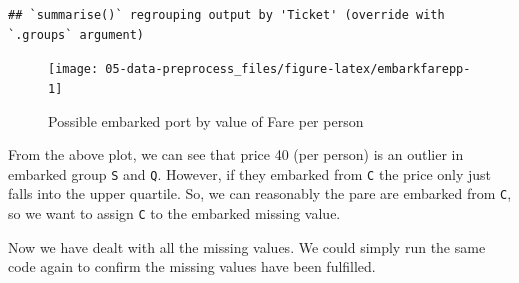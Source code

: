 \documentclass[
]{book}
\newenvironment{Shaded}{\begin{snugshade}}{\end{snugshade}}
\newcommand{\DataTypeTok}[1]{\textcolor[rgb]{0.13,0.29,0.53}{#1}}
\newcommand{\DecValTok}[1]{\textcolor[rgb]{0.00,0.00,0.81}{#1}}
\newcommand{\KeywordTok}[1]{\textcolor[rgb]{0.13,0.29,0.53}{\textbf{#1}}}
\newcommand{\NormalTok}[1]{#1}
\newcommand{\OperatorTok}[1]{\textcolor[rgb]{0.81,0.36,0.00}{\textbf{#1}}}
\newcommand{\StringTok}[1]{\textcolor[rgb]{0.31,0.60,0.02}{#1}}
\begin{document}
\begin{verbatim}
## `summarise()` regrouping output by 'Ticket' (override with `.groups` argument)
\end{verbatim}

\begin{Shaded}
\end{Shaded}

\begin{figure}

{\centering \texttt{[image: 05-data-preprocess\_files/figure-latex/embarkfarepp-1]} 

}

\caption{Possible embarked port by value of Fare per person}\label{fig:embarkfarepp}
\end{figure}

From the above plot, we can see that price 40 (per person) is an outlier in embarked group \texttt{S} and \texttt{Q}. However, if they embarked from \texttt{C} the price only just falls into the upper quartile. So, we can reasonably the pare are embarked from \texttt{C}, so we want to assign \texttt{C} to the embarked missing value.

\begin{Shaded}
\end{Shaded}

Now we have dealt with all the missing values. We could simply run the same code again to confirm the missing values have been fulfilled.
\end{document}

